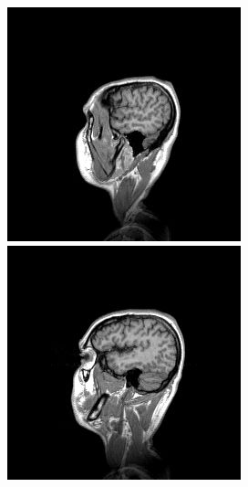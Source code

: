 \begin{figure}[ht]
\begin{minipage}[c]{0.19\linewidth}
            \includegraphics[width=\textwidth]{Files/report_images/sagittal_example2.jpg}
        \end{minipage}
        \begin{minipage}[c]{0.19\linewidth}
            \centering
            \includegraphics[width=\textwidth]{Files/report_images/sagittal_example3.jpg}

\end{minipage}
\end{figure}
